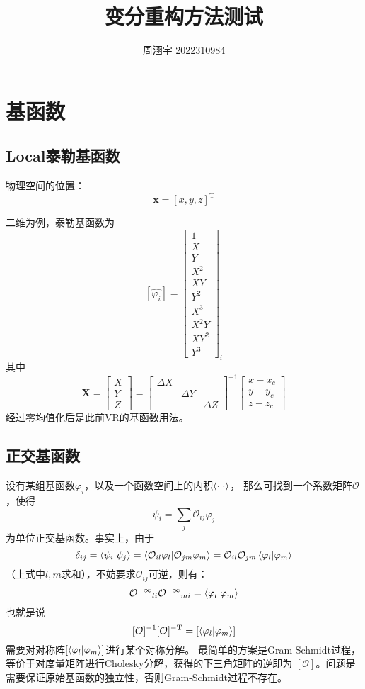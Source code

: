 \documentclass[UTF8,zihao=5]{ctexart} %
\title{{\bfseries\rmfamily\Huge{变分重构方法测试}}}
\author{周涵宇 2022310984}
\date{}
\newcommand{\bm}[1]{{\mathbf{#1}}}
\newcommand{\trans}[0]{^\mathrm{T}}
\newcommand*{\inc}[0]{{\Delta}}
\newcommand*{\xx}[0]{\bm{x}}
\begin{document}
\maketitle

\section{基函数}

\subsection{Local泰勒基函数}

物理空间的位置：
$$
    \xx = [x,y,z]\trans
$$

二维为例，泰勒基函数为
$$
    [\hat{\varphi_i}]=
    \begin{bmatrix}
        1    \\
        X    \\
        Y    \\
        X^2  \\
        XY   \\
        Y^2  \\
        X^3  \\
        X^2Y \\
        XY^2 \\
        Y^3
    \end{bmatrix}_i
$$
其中
$$
    \bm{X}=\begin{bmatrix}
        X \\Y\\Z
    \end{bmatrix}=\begin{bmatrix}
        \inc X &  & \\ & \inc Y & \\ & & \inc Z
    \end{bmatrix}^{-1}\begin{bmatrix}
        x-x_c \\y-y_c\\z-z_c
    \end{bmatrix}
$$
经过零均值化后是此前VR的基函数用法。

\subsection{正交基函数}

设有某组基函数$\varphi_i$，以及一个函数空间上的内积$\innerproduct{\cdot}{\cdot}$，
那么可找到一个系数矩阵$\mathcal{O}$，使得
$$
    \psi_i = \sum_j{\mathcal{O}_{ij}\varphi_j}
$$
为单位正交基函数。事实上，由于
$$
    \delta_{ij}=\innerproduct{\psi_i}{\psi_j}
    =\innerproduct{\mathcal{O}_{il}\varphi_l}{\mathcal{O}_{jm}\varphi_m}
    =\mathcal{O}_{il}\mathcal{O}_{jm}\innerproduct{\varphi_l}{\varphi_m}
$$
（上式中$l,m$求和），不妨要求$\mathcal{O}_{ij}$可逆，则有：
$$
    \mathcal{O^{-1}}_{li}\mathcal{O^{-1}}_{mi}=\innerproduct{\varphi_l}{\varphi_m}
$$
也就是说
$$
    [\mathcal{O}]^{-1}[\mathcal{O}]^{-\mathrm{T}}=[\innerproduct{\varphi_l}{\varphi_m}]
$$
需要对对称阵$[\innerproduct{\varphi_l}{\varphi_m}]$进行某个对称分解。
最简单的方案是Gram-Schmidt过程，等价于对度量矩阵进行Cholesky分解，获得的下三角矩阵的逆即为
$[\mathcal{O}]$。问题是需要保证原始基函数的独立性，否则Gram-Schmidt过程不存在。
\end{document}
